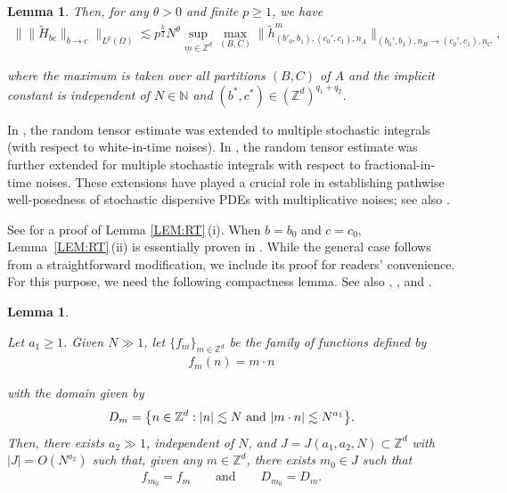 \documentclass[%
11pt,  reqno]{amsart}
\newtheorem{lemma}[theorem]{Lemma}
\newcommand{\1}{\hspace{0.2mm}\text{I}\hspace{0.2mm}}
\newcommand{\noi}{\noindent}
\newcommand{\Z}{\mathbb{Z}}
\newcommand{\wt}{\widetilde}
\renewcommand{\O}{\Omega}
\newcommand{\les}{\lesssim}
\newcommand{\N}{\mathbb{N}}
\numberwithin{equation}{section}
\numberwithin{theorem}{section}
\begin{document}
\begin{lemma}
\noi
Then, 
 for any $\theta > 0$ and finite $p \ge 1$, we have
\begin{align}
\big\| \| \wt H_{bc} \|_{b \to c} \big\|_{L^p(\O)} 
\les p^{\frac k2} N^{\theta}
\sup_{m \in \Z^d}
 \max_{(B,C)} \|
\wt h^m_{(b'_0, b_1), (c_0', c_1), n_A} \|_{(b_0', b_1), n_B \to (c_0', c_1),  n_C}, 
\label{XY1a}
\end{align}

\noi
where the maximum is taken over  all partitions $(B,C)$ of $A$
and the implicit constant is independent of $N \in \N$
and $(b^*, c^*) \in (\Z^d)^{q_1 + q_2}$.



\end{lemma}



In \cite{OWZ}, 
the random tensor estimate 
was 
extended to multiple stochastic integrals (with respect to white-in-time noises).
In \cite{CLO, COZ}, 
the random tensor estimate
was further extended 
for multiple stochastic integrals with respect to fractional-in-time noises.
These extensions have played a crucial 
role
in establishing pathwise well-posedness
of stochastic dispersive PDEs with multiplicative noises;
see also \cite{CGLLO}.

See 
\cite[Lemma C.3 and Remark C.4 (ii)]{OWZ}
for a proof of Lemma \ref{LEM:RT}\,(i). 
When $b = b_0$ and $c = c_0$, 
Lemma~\ref{LEM:RT}\,(ii) is essentially proven in \cite[Proposition 4.15]{DNY3}.
While the general case follows from a straightforward modification, 
we include its proof for readers' convenience.
For this purpose, we need the following
compactness lemma.
See also 
\cite[Claim~5.2]{DNY2},
 \cite[Claim~3.7]{DH1}, and \cite[Claim~4.16]{DNY3}.









\begin{lemma} \label{LEM:DH}


Let $a_1 \ge 1 $.
Given $N \gg 1$, 
let $\{f_m\}_{m \in \Z^d}$ be the family of functions defined by
\begin{align*}
f_m (n) = m \cdot n
\end{align*}

\noi
with the domain given by 
\begin{align}\label{EJ1x}
D_m = \big\{n \in \Z^d: |n| \les N \textup{ and } |m \cdot n| \les N^{a_1}\big\}.
\end{align}
Then, there exists $a_2 \gg 1$, independent of $N$,  and $J = J (a_1,a_2,N) \subset \Z^d$ 
with  $|J| = O(N^{a_2})$
such that, 
given  any $m \in \Z^d$,
there exists $m_0 \in J$ such that 
\begin{align}
f_{m_0} = f_m\qquad \text{and}\qquad  D_{m_0} = D_m.
\label{EJ2y}
\end{align}
\end{lemma}
\end{document}

